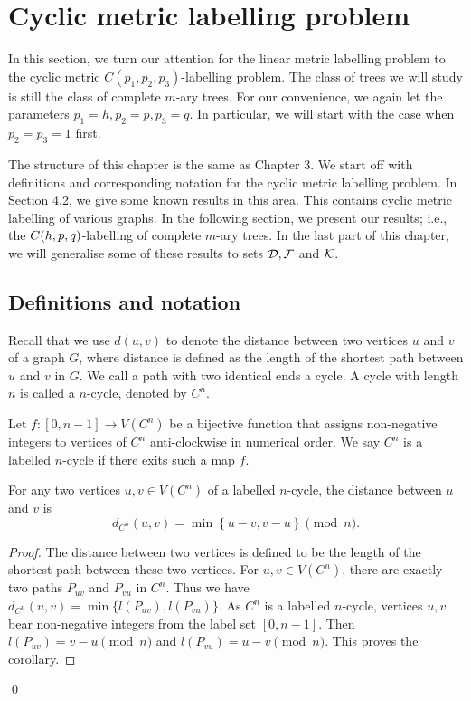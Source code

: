 \chapter{Cyclic metric labelling problem}

In this section, we turn our attention for the linear metric labelling problem to the cyclic metric $C(p_1, p_2, p_3)$-labelling problem. The class of trees we will study is still the class of complete $m$-ary trees. For our convenience, we again let the parameters $p_1=h,p_2=p, p_3=q$. In particular, we will start with the case when $p_2 = p_3 = 1$ first.  

The structure of this chapter is the same as Chapter 3. We start off with definitions and corresponding notation for the cyclic metric labelling problem. In Section 4.2, we give some known results in this area. This contains cyclic metric labelling of various graphs. In the following section, we present our results; i.e.,  the $C(h,p,q)$-labelling of complete $m$-ary trees. In the last part of this chapter, we will generalise some of these results to sets ${\cal D}, {\cal F}$ and ${\cal K}$.  


\section{Definitions and notation}

Recall that we use $d(u,v)$ to denote the distance between two vertices $u$ and $v$ of a graph $G$, where distance is defined as the length of the shortest path between $u$ and $v$ in $G$. We call a path with two identical ends a cycle. A cycle with length $n$ is called a $n$-cycle, denoted by $C^n$. 

\begin{definition}
\label{labelled cycle}
Let $f:[0,n-1] \rightarrow V(C^n)$ be a bijective function that assigns non-negative integers to vertices of $C^n$ anti-clockwise in numerical order. We say $C^n$ is a labelled $n$-cycle if there exits such a map $f$. 
\end{definition}

\begin{corollary}
\label{cor:mod}
For any two vertices $u, v \in V(C^n)$ of a labelled $n$-cycle, the distance between $u$ and $v$ is 
\[
d_{C^n}(u, v) = \min \left\{u-v, v-u\right\} \pmod {n}.
\]
\end{corollary}

\begin{proof}
The distance between two vertices is defined to be the length of the shortest path between these two vertices. For $u, v \in V(C^n)$, there are exactly two paths $P_{uv}$ and $P_{vu}$ in $C^n$. Thus we have $d_{C^n}(u,v) = \min\{l(P_{uv}), l(P_{vu})\}$. As $C^n$ is a labelled $n$-cycle, vertices $u,v$ bear non-negative integers from the label set $[0, n-1]$. Then $l(P_{uv}) = v-u \pmod{n}$ and $l(P_{vu}) = u-v \pmod{n}$. This proves the corollary. 
\end{proof}
\qed

